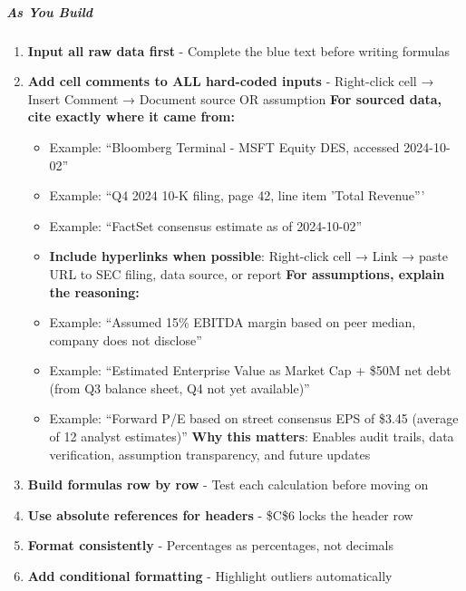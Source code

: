 \documentclass[11pt]{article}
\begin{document}
\subparagraph{As You Build}\mbox{}\par
\begin{enumerate}[leftmargin=*,itemsep=2pt,topsep=2pt]
\item {} \textbf{Input all raw data first} - Complete the blue text before writing formulas
\item {} \textbf{Add cell comments to ALL hard-coded inputs} - Right-click cell → Insert Comment → Document source OR assumption \textbf{For sourced data, cite exactly where it came from:}
\begin{itemize}[leftmargin=*,itemsep=2pt,topsep=2pt]
\item {} Example: ``Bloomberg Terminal - MSFT Equity DES, accessed 2024-10-02''
\item {} Example: ``Q4 2024 10-K filing, page 42, line item 'Total Revenue'''
\item {} Example: ``FactSet consensus estimate as of 2024-10-02''
\item {} \textbf{Include hyperlinks when possible}: Right-click cell → Link → paste URL to SEC filing, data source, or report \textbf{For assumptions, explain the reasoning:}
\item {} Example: ``Assumed 15\% EBITDA margin based on peer median, company does not disclose''
\item {} Example: ``Estimated Enterprise Value as Market Cap + \$50M net debt (from Q3 balance sheet, Q4 not yet available)''
\item {} Example: ``Forward P/E based on street consensus EPS of \$3.45 (average of 12 analyst estimates)'' \textbf{Why this matters}: Enables audit trails, data verification, assumption transparency, and future updates
\end{itemize}
\item {} \textbf{Build formulas row by row} - Test each calculation before moving on
\item {} \textbf{Use absolute references for headers} - \$C\$6 locks the header row
\item {} \textbf{Format consistently} - Percentages as percentages, not decimals
\item {} \textbf{Add conditional formatting} - Highlight outliers automatically
\end{enumerate}
\end{document}
